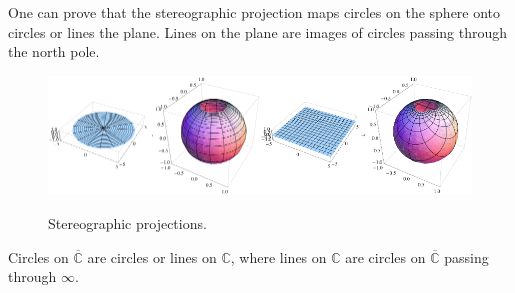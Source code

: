 \documentclass[11pt]{book}
\theoremstyle{definition}
\numberwithin{equation}{chapter}
\begin{document}
\medskip

One can prove that the stereographic projection maps circles on the sphere onto circles or lines the plane. Lines on the plane are images of circles passing through the north pole. 
\begin{figure}[H]
    \centering
    \includegraphics[width=0.5\textwidth]{PolarStereoProj.png}\includegraphics[width=0.5\textwidth]{CartesianStereoProj.png}
    \caption{Stereographic projections.}
    \label{fig:Stereo_proj}
\end{figure}
Circles on $\overline{\mathbb{C}}$ are circles or lines on $\mathbb{C}$, where lines on $\mathbb{C}$ are circles on $\overline{\mathbb{C}}$ passing through $\infty$. 

\medskip
\end{document}

